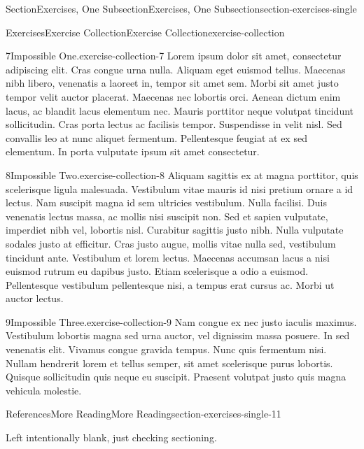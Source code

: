 \documentclass[oneside,10pt,]{article}
\numberwithin{equation}{section}
\begin{document}
\begin{sectionptx}{Section}{Exercises, One Subsection}{}{Exercises, One Subsection}{}{}{section-exercises-single}
\begin{exercises-subsection-numberless}{Exercises}{Exercise Collection}{}{Exercise Collection}{}{}{exercise-collection}
\begin{divisionexercise}{7}{Impossible One.}{}{exercise-collection-7}
Lorem ipsum dolor sit amet, consectetur adipiscing elit. Cras congue urna nulla. Aliquam eget euismod tellus. Maecenas nibh libero, venenatis a laoreet in, tempor sit amet sem. Morbi sit amet justo tempor velit auctor placerat. Maecenas nec lobortis orci. Aenean dictum enim lacus, ac blandit lacus elementum nec. Mauris porttitor neque volutpat tincidunt sollicitudin. Cras porta lectus ac facilisis tempor. Suspendisse in velit nisl. Sed convallis leo at nunc aliquet fermentum. Pellentesque feugiat at ex sed elementum. In porta vulputate ipsum sit amet consectetur.%
\end{divisionexercise}%
\begin{divisionexercise}{8}{Impossible Two.}{}{exercise-collection-8}%
Aliquam sagittis ex at magna porttitor, quis scelerisque ligula malesuada. Vestibulum vitae mauris id nisi pretium ornare a id lectus. Nam suscipit magna id sem ultricies vestibulum. Nulla facilisi. Duis venenatis lectus massa, ac mollis nisi suscipit non. Sed et sapien vulputate, imperdiet nibh vel, lobortis nisl. Curabitur sagittis justo nibh. Nulla vulputate sodales justo at efficitur. Cras justo augue, mollis vitae nulla sed, vestibulum tincidunt ante. Vestibulum et lorem lectus. Maecenas accumsan lacus a nisi euismod rutrum eu dapibus justo. Etiam scelerisque a odio a euismod. Pellentesque vestibulum pellentesque nisi, a tempus erat cursus ac. Morbi ut auctor lectus.%
\end{divisionexercise}%
\begin{divisionexercise}{9}{Impossible Three.}{}{exercise-collection-9}%
Nam congue ex nec justo iaculis maximus. Vestibulum lobortis magna sed urna auctor, vel dignissim massa posuere. In sed venenatis elit. Vivamus congue gravida tempus. Nunc quis fermentum nisi. Nullam hendrerit lorem et tellus semper, sit amet scelerisque purus lobortis. Quisque sollicitudin quis neque eu suscipit. Praesent volutpat justo quis magna vehicula molestie.%
\end{divisionexercise}%
\end{exercises-subsection-numberless}
%
%
\typeout{************************************************}
\typeout{************************************************}
%
\begin{references-subsection-numberless}{References}{More Reading}{}{More Reading}{}{}{section-exercises-single-11}
\begin{headnote}{}%
Left intentionally blank, just checking sectioning.%
\end{headnote}%

\end{references-subsection-numberless}
\end{sectionptx}
\end{document}
